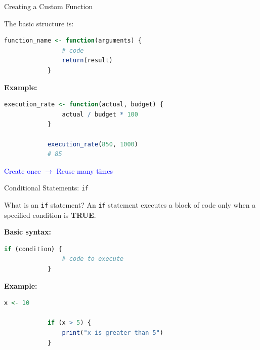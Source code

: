 \documentclass[aspectratio=169,11pt]{beamer}
\begin{document}
	
	\begin{frame}[fragile]{Creating a Custom Function}
		
		The basic structure is:
		
		\begin{lstlisting}[language=R]
			function_name <- function(arguments) {
				# code
				return(result)
			}
		\end{lstlisting}
		
		\vspace{0.3cm}
		
		\textbf{Example:}
		
		\begin{lstlisting}[language=R]
			execution_rate <- function(actual, budget) {
				actual / budget * 100
			}
			
			execution_rate(850, 1000)
			# 85
		\end{lstlisting}
		
		\vspace{0.2cm}
		
		\centering
		\textcolor{blue}{Create once $\rightarrow$ Reuse many times}
		
	\end{frame}
	
	\begin{frame}[fragile]{Conditional Statements: \texttt{if}}
		
		\begin{block}{What is an \texttt{if} statement?}
			An \texttt{if} statement executes a block of code only when a specified
			condition is \textbf{TRUE}.
		\end{block}
		
		\vspace{0.3cm}
		
		\textbf{Basic syntax:}
		
		\begin{lstlisting}[language=R]
			if (condition) {
				# code to execute
			}
		\end{lstlisting}
		
		\vspace{0.2cm}
		
		\textbf{Example:}
		
		\begin{lstlisting}[language=R]
			x <- 10
			
			if (x > 5) {
				print("x is greater than 5")
			}
		\end{lstlisting}
		
	\end{frame}
	
\end{document}
